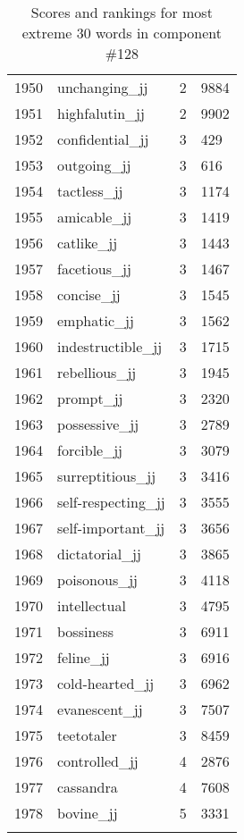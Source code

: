 \begin{longtable}[!htbp]{| rlr@{.}l |}
    1950 & unchanging\_jj & 2 & 9884 \\
    1951 & highfalutin\_jj & 2 & 9902 \\
    1952 & confidential\_jj & 3 & 429 \\
    1953 & outgoing\_jj & 3 & 616 \\
    1954 & tactless\_jj & 3 & 1174 \\
    1955 & amicable\_jj & 3 & 1419 \\
    1956 & catlike\_jj & 3 & 1443 \\
    1957 & facetious\_jj & 3 & 1467 \\
    1958 & concise\_jj & 3 & 1545 \\
    1959 & emphatic\_jj & 3 & 1562 \\
    1960 & indestructible\_jj & 3 & 1715 \\
    1961 & rebellious\_jj & 3 & 1945 \\
    1962 & prompt\_jj & 3 & 2320 \\
    1963 & possessive\_jj & 3 & 2789 \\
    1964 & forcible\_jj & 3 & 3079 \\
    1965 & surreptitious\_jj & 3 & 3416 \\
    1966 & self-respecting\_jj & 3 & 3555 \\
    1967 & self-important\_jj & 3 & 3656 \\
    1968 & dictatorial\_jj & 3 & 3865 \\
    1969 & poisonous\_jj & 3 & 4118 \\
    1970 & intellectual & 3 & 4795 \\
    1971 & bossiness & 3 & 6911 \\
    1972 & feline\_jj & 3 & 6916 \\
    1973 & cold-hearted\_jj & 3 & 6962 \\
    1974 & evanescent\_jj & 3 & 7507 \\
    1975 & teetotaler & 3 & 8459 \\
    1976 & controlled\_jj & 4 & 2876 \\
    1977 & cassandra & 4 & 7608 \\
    1978 & bovine\_jj & 5 & 3331 \\
    \hline
    \caption{Scores and rankings for most extreme 30 words in component \#128} \\
\end{longtable}
